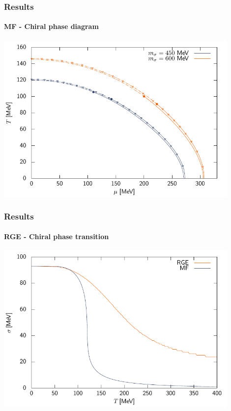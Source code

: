 \documentclass[10pt,a4paper,usenames,dvipsnames]{beamer}
\begin{document}
\begin{frame}
  \frametitle{Results}
  \framesubtitle{MF - Chiral phase diagram}

  {\centering
    \includegraphics[width=0.9\textwidth]{Plots/2_3mixed.pdf}
   \par}
\end{frame}

\begin{frame}
  \frametitle{Results}
  \framesubtitle{RGE - Chiral phase transition}

  {\centering
    \includegraphics[width=0.9\textwidth]{Plots/rgetrans.pdf}
   \par}
\end{frame}
\end{document}
